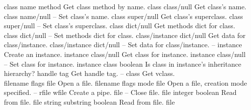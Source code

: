 \begin{longtable}{}
\hline
\optableent
	{class name}
	{{\bf {}}}
	{method}
	{Get class method by name.}
\hline
\optableent
	{class}
	{{\bf {}}}
	{class/null}
	{Get class's name.}
\hline
\optableent
	{class name/null}
	{{\bf {}}}
	{--}
	{Set class's name.}
\hline
\optableent
	{class}
	{{\bf {}}}
	{super/null}
	{Get class's superclass.}
\hline
\optableent
	{class super/null}
	{{\bf {}}}
	{--}
	{Set class's superclass.}
\hline
\optableent
	{class}
	{{\bf {}}}
	{dict/null}
	{Get methods dict for class.}
\hline
\optableent
	{class dict/null}
	{{\bf {}}}
	{--}
	{Set methods dict for class.}
\hline
\optableent
	{class/instance}
	{{\bf {}}}
	{dict/null}
	{Get data for class/instance.}
\hline
\optableent
	{class/instance dict/null}
	{{\bf {}}}
	{--}
	{Set data for class/instance.}
\hline
\optableent
	{--}
	{{\bf {}}}
	{instance}
	{Create an instance.}
\hline
\optableent
	{instance}
	{{\bf {}}}
	{class/null}
	{Get class for instance.}
\hline
\optableent
	{instance class/null}
	{{\bf {}}}
	{--}
	{Set class for instance.}
\hline
\optableent
	{instance class}
	{{\bf {}}}
	{boolean}
	{Is class in instance's inheritance hierarchy?}
\hline
\optableent
	{handle}
	{{\bf {}}}
	{tag}
	{Get handle tag.}
\hline
\optableent
	{--}
	{{\bf {}}}
	{class}
	{Get vclass.}
\hline \hline
{} \\
\hline \hline
\optableent
	{filename flags}
	{{\bf {}}}
	{file}
	{Open a file.}
\optableent
	{filename flags mode}
	{{\bf {}}}
	{file}
	{Open a file, creation mode specified.}
\hline
\optableent
	{--}
	{{\bf {}}}
	{rfile wfile}
	{Create a pipe.}
\hline
\optableent
	{file}
	{{\bf {}}}
	{--}
	{Close file.}
\hline
\optableent
	{file}
	{{\bf {}}}
	{integer boolean}
	{Read from file.}
\optableent
	{file string}
	{{\bf {}}}
	{substring boolean}
	{Read from file.}
\optableent
	{file}
	{{\bf {}}}

\end{longtable}
